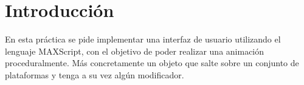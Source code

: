 \section{Introducción}

En esta práctica se pide implementar una interfaz de usuario utilizando el lenguaje MAXScript, con el objetivo de poder realizar una animación proceduralmente. Más concretamente un objeto que salte sobre un conjunto de plataformas y tenga a su vez algún modificador.